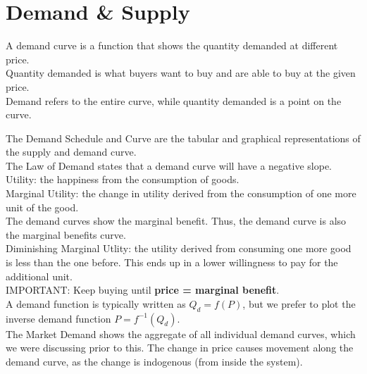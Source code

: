 \documentclass[nobib]{tufte-handout}
\begin{document}
\section{Demand \& Supply}
A demand curve is a function that shows the quantity demanded at different
price.\\ Quantity demanded is what buyers want to buy and are able to buy at
the given price.\\ Demand refers to the entire curve, while quantity demanded
is a point on the curve.\\
\begin{center}
\end{center}
The Demand Schedule and Curve are the tabular and graphical representations of the supply and demand curve.\\
The Law of Demand states that a demand curve will have a negative slope.\\
Utility: the happiness from the consumption of goods.\\
Marginal Utility: the change in utility derived from the consumption of one more unit of the good.\\
The demand curves show the marginal benefit. Thus, the demand curve is also the marginal benefits curve.\\
Diminishing Marginal Utlity: the utility derived from consuming one more good is less than the one before. This ends up in a lower willingness to pay for the additional unit.\\
IMPORTANT: Keep buying until \textbf{price = marginal benefit}.\\
A demand function is typically written as $Q_d=f(P)$, but we prefer to plot the inverse demand function $P = f^{-1}(Q_d)$.\\
The Market Demand shows the aggregate of all individual demand curves, which we were discussing prior to this.
The change in price causes movement along the demand curve, as the change is indogenous (from inside the system).\\
\end{document}
